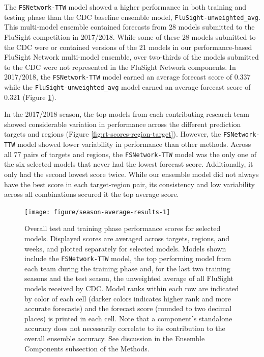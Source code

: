 \documentclass{article}\usepackage[]{graphicx}\usepackage[]{color}
\newenvironment{knitrout}{}{} %
\begin{document}
The {\tt FSNetwork-TTW} model showed a higher performance in both training and testing phase than the CDC baseline ensemble model, {\tt FluSight-unweighted\_avg}.
This multi-model ensemble contained forecasts from 28 models submitted to the FluSight competition in 2017/2018.
While some of these 28 models submitted to the CDC were or contained versions of the 21 models in our performance-based FluSight Network multi-model ensemble, over two-thirds of the models submitted to the CDC were not represented in the FluSight Network components.
In 2017/2018, the {\tt FSNetwork-TTW} model earned an average forecast score of
0.337 
while the {\tt FluSight-unweighted\_avg} model earned an average forecast score of
0.321 (Figure \ref{fig:season-average-results}).

In the 2017/2018 season, the top models from each contributing research team showed considerable variation in performance across the different prediction targets and regions (Figure \ref{fig:rt-scores-region-target}). 
However, the {\tt FSNetwork-TTW} model showed lower variability in performance than other methods. 
Across all 77 pairs of targets and regions, the {\tt FSNetwork-TTW} model was the only one of the six selected models that never had the lowest forecast score.
Additionally, it only had the second lowest score twice. 
While our ensemble model did not always have the best score in each target-region pair, its consistency and low variability across all combinations secured it the top average score.



\begin{knitrout}
\color{fgcolor}\begin{figure}
\texttt{[image: figure/season-average-results-1]} \caption[Overall test and training phase performance scores for selected models]{Overall test and training phase performance scores for selected models. Displayed scores are averaged across targets, regions, and weeks, and plotted separately for selected models. Models shown include the {\tt FSNetwork-TTW} model, the top performing model from each team during the training phase and, for the last two training seasons and the test season, the unweighted average of all FluSight models received by CDC. Model ranks within each row are indicated by color of each cell (darker colors indicates higher rank and more accurate forecasts) and the forecast score (rounded to two decimal places) is printed in each cell. Note that a component's standalone accuracy does not necessarily correlate to its contribution to the overall ensemble accuracy.  See discussion in the Ensemble Components subsection of the Methods.}\label{fig:season-average-results}
\end{figure}


\end{knitrout}
\end{document}
